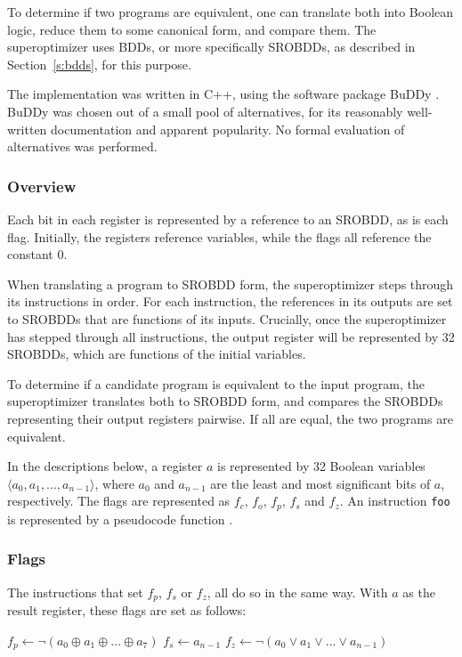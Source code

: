 \documentclass[a4paper,11pt]{kth-mag}
\renewcommand{\gets}{\leftarrow}
\newcommand{\IOR}{\lor}
\newcommand{\XOR}{\oplus}
\newcommand{\NOT}{\lnot}
\begin{document}
To determine if two programs are equivalent, one can translate both into Boolean logic, reduce them to some canonical form, and compare them.
The superoptimizer uses BDDs, or more specifically SROBDDs, as described in Section~\ref{s:bdds}, for this purpose.

The implementation was written in C++, using the software package BuDDy \cite{buddy}.
BuDDy was chosen out of a small pool of alternatives, for its reasonably well-written documentation and apparent popularity.
No formal evaluation of alternatives was performed.

\subsubsection{Overview}

Each bit in each register is represented by a reference to an SROBDD, as is each flag.
Initially, the registers reference variables, while the flags all reference the constant 0.

When translating a program to SROBDD form, the superoptimizer steps through its instructions in order.
For each instruction, the references in its outputs are set to SROBDDs that are functions of its inputs.
Crucially, once the superoptimizer has stepped through all instructions, the output register will be represented by 32 SROBDDs, which are functions of the initial variables.

To determine if a candidate program is equivalent to the input program, the superoptimizer translates both to SROBDD form, and compares the SROBDDs representing their output registers pairwise.
If all are equal, the two programs are equivalent.

In the descriptions below, a register $a$ is represented by 32 Boolean variables $\langle a_0, a_1, ..., a_{n-1} \rangle$, where $a_0$ and $a_{n-1}$ are the least and most significant bits of $a$, respectively.
The flags are represented as $f_c$, $f_o$, $f_p$, $f_s$ and $f_z$.
An instruction \verb|foo| is represented by a pseudocode function .

\subsubsection{Flags}

The instructions that set $f_p$, $f_s$ or $f_z$, all do so in the same way.
With $a$ as the result register, these flags are set as follows:

\begin{codebox}
\zi $f_p \gets \NOT(a_0 \XOR a_1 \XOR ... \XOR a_7)$
\zi $f_s \gets a_{n-1}$
\zi $f_z \gets \NOT(a_0 \IOR a_1 \IOR ... \IOR a_{n-1})$
\end{codebox}
\end{document}
